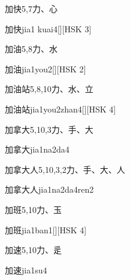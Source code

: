\begin{entry}{加快}{5,7}{⼒、⼼}
  \begin{phonetics}{加快}{jia1 kuai4}[][HSK 3]
  \end{phonetics}
\end{entry}

\begin{entry}{加油}{5,8}{⼒、⽔}
  \begin{phonetics}{加油}{jia1you2}[][HSK 2]
  \end{phonetics}
\end{entry}

\begin{entry}{加油站}{5,8,10}{⼒、⽔、⽴}
  \begin{phonetics}{加油站}{jia1you2zhan4}[][HSK 4]
  \end{phonetics}
\end{entry}

\begin{entry}{加拿大}{5,10,3}{⼒、⼿、⼤}
  \begin{phonetics}{加拿大}{jia1na2da4}
  \end{phonetics}
\end{entry}

\begin{entry}{加拿大人}{5,10,3,2}{⼒、⼿、⼤、⼈}
  \begin{phonetics}{加拿大人}{jia1na2da4ren2}
  \end{phonetics}
\end{entry}

\begin{entry}{加班}{5,10}{⼒、⽟}
  \begin{phonetics}{加班}{jia1ban1}[][HSK 4]
  \end{phonetics}
\end{entry}

\begin{entry}{加速}{5,10}{⼒、⾡}
  \begin{phonetics}{加速}{jia1su4}
  \end{phonetics}
\end{entry}

